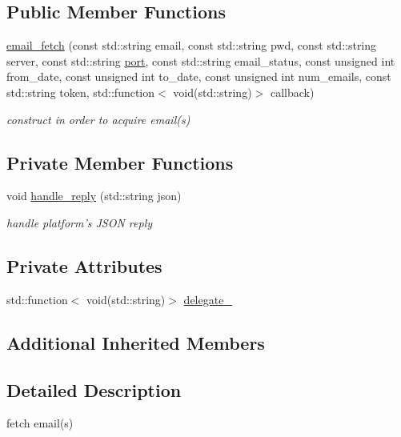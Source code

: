\subsection*{Public Member Functions}
\begin{DoxyCompactItemize}
\item 
\hyperlink{classrapp_1_1cloud_1_1email__fetch_a4522a15f36c9a7addb78a682dc81476f}{email\-\_\-fetch} (const std\-::string email, const std\-::string pwd, const std\-::string server, const std\-::string \hyperlink{namespacerapp_1_1cloud_ae0e4cb6fd54bbf45234fc3c21f752b7a}{port}, const std\-::string email\-\_\-status, const unsigned int from\-\_\-date, const unsigned int to\-\_\-date, const unsigned int num\-\_\-emails, const std\-::string token, std\-::function$<$ void(std\-::string)$>$ callback)
\begin{DoxyCompactList}\small\item\em construct in order to acquire email(s) \end{DoxyCompactList}\end{DoxyCompactItemize}
\subsection*{Private Member Functions}
\begin{DoxyCompactItemize}
\item 
void \hyperlink{classrapp_1_1cloud_1_1email__fetch_aed7a492ea2a193cd09ae23e093d05221}{handle\-\_\-reply} (std\-::string json)
\begin{DoxyCompactList}\small\item\em handle platform's J\-S\-O\-N reply \end{DoxyCompactList}\end{DoxyCompactItemize}
\subsection*{Private Attributes}
\begin{DoxyCompactItemize}
\item 
std\-::function$<$ void(std\-::string)$>$ \hyperlink{classrapp_1_1cloud_1_1email__fetch_a1eb39614f4591489d29874dfa9b0bcda}{delegate\-\_\-}
\end{DoxyCompactItemize}
\subsection*{Additional Inherited Members}


\subsection{Detailed Description}
fetch email(s) 

